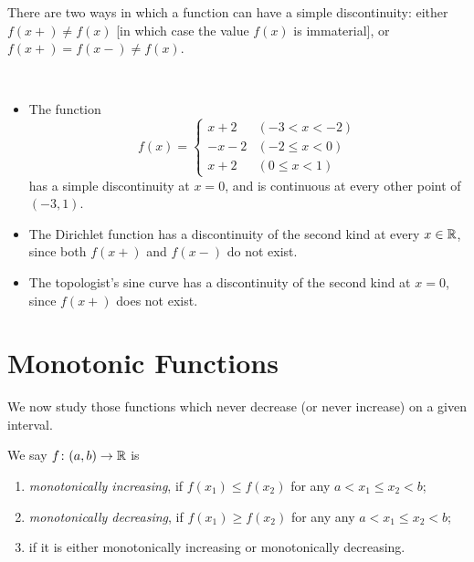 There are two ways in which a function can have a simple discontinuity: either $f(x+)\neq f(x)$ [in which case the value $f(x)$ is immaterial], or $f(x+)=f(x-)\neq f(x)$.

\begin{example} \
\begin{itemize}
\item The function
\[f(x)=\begin{cases}
x+2&(-3<x<-2)\\
-x-2&(-2\le x<0)\\
x+2&(0\le x<1)
\end{cases}\]
has a simple discontinuity at $x=0$, and is continuous at every other point of $(-3,1)$.
\item The Dirichlet function has a discontinuity of the second kind at every $x\in\mathbb R$, since both $f(x+)$ and $f(x-)$ do not exist.
\item The topologist's sine curve has a discontinuity of the second kind at $x=0$, since $f(x+)$ does not exist.
\end{itemize}
\end{example}
\pagebreak

\section{Monotonic Functions}
We now study those functions which never decrease (or never increase) on a given interval. 

\begin{definition}[Monotonicity]
We say $f\colon (a,b)\to\mathbb R$ is
\begin{enumerate}[label=(\roman*)]
\item \emph{monotonically increasing}, if $f(x_1)\le f(x_2)$ for any $a<x_1\le x_2<b$;
\item \emph{monotonically decreasing}, if $f(x_1)\ge f(x_2)$ for any any $a<x_1\le x_2<b$;
\item \vocab{monotonic} if it is either monotonically increasing or monotonically decreasing.
\end{enumerate}
\end{definition}

\begin{comment}
\begin{definition}[Convexity]
A function $f$ is \vocab{convex} if for all $x_1,x_2\in D_f$ and $0\le t\le 1$, we have
\[ f(tx_1+(1-t)x_2)\le tf(x_1)+(1-t)f(x_2).\]
$f$ is \emph{strictly convex} if the $\le$ sign above is replaced with a strict inequality $<$.

Similarly, $f$ is \vocab{concave} if for all $x_1,x_2\in D_f$ and $0\le t\le 1$, we have
\[ f(tx_1+(1-t)x_2)\ge tf(x_1)+(1-t)f(x_2). \]
$f$ is \emph{strictly concave} if the $\ge$ sign above is replaced with a strict inequality $>$.
\end{definition}
\end{comment}

